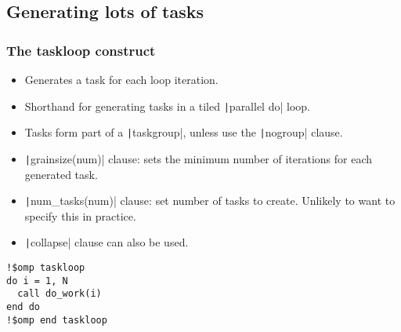 \documentclass{beamer}
\begin{document}
\subsection{Generating lots of tasks}
\begin{frame}[fragile]
\frametitle{The taskloop construct}

\begin{itemize}
  \item Generates a task for each loop iteration.
  \item Shorthand for generating tasks in a tiled \texttt|parallel do| loop.
  \item Tasks form part of a \texttt|taskgroup|, unless use the \texttt|nogroup| clause.
  \item \texttt|grainsize(num)| clause: sets the minimum number of iterations for each generated task.
  \item \texttt|num_tasks(num)| clause: set number of tasks to create. Unlikely to want to specify this in practice.
  \item \texttt|collapse| clause can also be used.
\end{itemize}

\begin{verbatim}
!$omp taskloop
do i = 1, N
  call do_work(i)
end do
!$omp end taskloop
\end{verbatim}

\end{frame}
\end{document}

